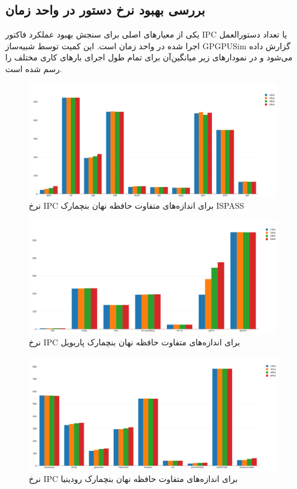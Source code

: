 \documentclass{thesis}
\begin{document}
\subsection{
بررسی بهبود نرخ دستور در واحد زمان
}

یکی از معیار‌های اصلی برای سنجش بهبود عملکرد فاکتور
IPC
یا تعداد دستورالعمل اجرا شده در واحد زمان است. این کمیت توسط شبیه‌ساز
GPGPUSim
گزارش داده می‌شود و در نمودار‌های زیر میانگین‌آن برای تمام طول اجرای بارهای کاری مختلف را رسم شده است.

\begin{figure}[h]
\centering
\includegraphics[width=\textwidth]{./pics/all_ipc_ispass}
\caption{
نرخ
IPC
برای اندازه‌های متفاوت حافظه نهان بنچمارک
ISPASS
}
\end{figure}

\begin{figure}[h]
\centering
\includegraphics[width=\textwidth]{./pics/all_ipc_parboil}
\caption{
نرخ
IPC
برای اندازه‌های متفاوت حافظه نهان بنچمارک
پاربویل
}
\end{figure}


\begin{figure}[h]
\centering
\includegraphics[width=\textwidth]{./pics/all_ipc_rodinia}
\caption{
نرخ
IPC
برای اندازه‌های متفاوت حافظه نهان بنچمارک
رودینیا
}
\end{figure}
\end{document}
